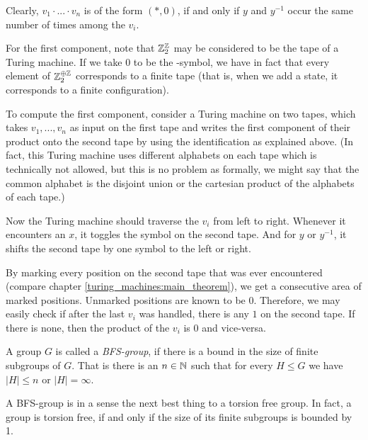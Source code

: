 	Clearly, $v_1 \cdot ... \cdot v_n$ is of the form $(*,0)$, if and only if $y$ and $y^{-1}$ occur the same number of times among the $v_i$.\footnotemark

	For the first component, note that $\mathbb{Z}_2^{\mathbb{Z}}$ may be considered to be the tape of a Turing machine.
	If we take $0$ to be the \EMP-symbol, we have in fact that every element of $\mathbb{Z}_2^{\oplus \mathbb{Z}}$ corresponds to a finite tape (that is, when we add a state, it corresponds to a finite configuration).

	To compute the first component, consider a Turing machine on two tapes, which takes $v_1,...,v_n$ as input on the first tape and writes the first component of their product onto the second tape by using the identification as explained above.
	(In fact, this Turing machine uses different alphabets on each tape which is technically not allowed, but this is no problem as formally, we might say that the common alphabet is the disjoint union or the cartesian product of the alphabets of each tape.)

	Now the Turing machine should traverse the $v_i$ from left to right.
	Whenever it encounters an $x$, it toggles the symbol on the second tape.
	And for $y$ or $y^{-1}$, it shifts the second tape by one symbol to the left or right.

	By marking every position on the second tape that was ever encountered (compare chapter \ref{turing_machines:main_theorem}), we get a consecutive area of marked positions.
	Unmarked positions are known to be $0$.
	Therefore, we may easily check if after the last $v_i$ was handled, there is any $1$ on the second tape. If there is none, then the product of the $v_i$ is $0$ and vice-versa.
\endproof

\begin{Definition}
	A group $G$ is called a \emph{BFS-group}, if there is a bound in the size of finite subgroups of $G$.
	That is there is an $n \in \mathbb{N}$ such that for every $H \leq G$ we have $|H| \leq n$ or $|H| = \infty$.
\end{Definition}

\begin{Remark}
	A BFS-group is in a sense the next best thing to a torsion free group.
	In fact, a group is torsion free, if and only if the size of its finite subgroups is bounded by 1.
\end{Remark}

